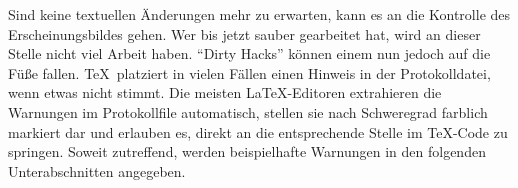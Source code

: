 Sind keine textuellen Änderungen mehr zu erwarten, kann es an die Kontrolle
des Erscheinungsbildes gehen. Wer bis jetzt sauber gearbeitet hat, wird an
dieser Stelle nicht viel Arbeit haben. "`Dirty Hacks"' können einem nun jedoch
auf die Füße fallen. \TeX\ platziert in vielen Fällen einen Hinweis in der
Protokolldatei, wenn etwas nicht stimmt. Die meisten \LaTeX-Editoren
extrahieren die Warnungen im Protokollfile automatisch, stellen sie nach
Schweregrad farblich markiert dar und erlauben es, direkt an die entsprechende
Stelle im \TeX-Code zu springen. Soweit zutreffend, werden beispielhafte
Warnungen in den folgenden Unterabschnitten angegeben.
